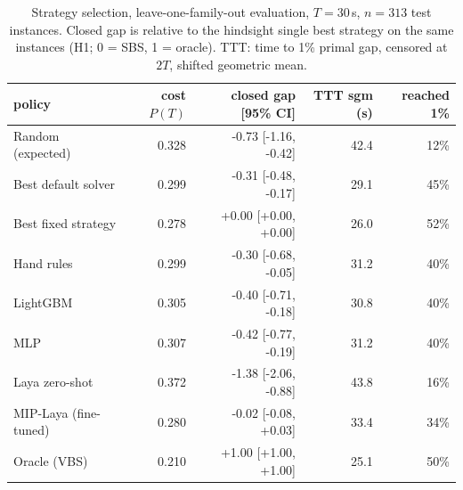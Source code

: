 \begin{table}[t]\centering\small
\begin{tabular}{lrrrr}
\toprule
policy & cost $P(T)$ & closed gap [95\% CI] & TTT sgm (s) & reached 1\% \\
\midrule
Random (expected) & 0.328 & -0.73 [-1.16, -0.42] & 42.4 & 12\% \\
Best default solver & 0.299 & -0.31 [-0.48, -0.17] & 29.1 & 45\% \\
Best fixed strategy & 0.278 & +0.00 [+0.00, +0.00] & 26.0 & 52\% \\
Hand rules & 0.299 & -0.30 [-0.68, -0.05] & 31.2 & 40\% \\
LightGBM & 0.305 & -0.40 [-0.71, -0.18] & 30.8 & 40\% \\
MLP & 0.307 & -0.42 [-0.77, -0.19] & 31.2 & 40\% \\
Laya zero-shot & 0.372 & -1.38 [-2.06, -0.88] & 43.8 & 16\% \\
MIP-Laya (fine-tuned) & 0.280 & -0.02 [-0.08, +0.03] & 33.4 & 34\% \\
Oracle (VBS) & 0.210 & +1.00 [+1.00, +1.00] & 25.1 & 50\% \\
\bottomrule
\end{tabular}
\caption{Strategy selection, leave-one-family-out evaluation, $T=30$\,s, $n=313$ test instances. Closed gap is relative to the hindsight single best strategy on the same instances (H1; 0 = SBS, 1 = oracle). TTT: time to 1\% primal gap, censored at $2T$, shifted geometric mean.}\label{tab:sel-lofo-30}
\end{table}